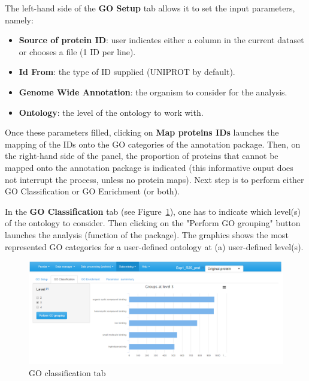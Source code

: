 \documentclass[12pt]{article}
\begin{document}
The left-hand side of the \textbf{GO Setup} tab allows it to set the input parameters, namely: 
\begin{itemize}
\item \textbf{Source of protein ID}: user indicates either a column in the current 
dataset or chooses a file (1 ID per line). 
\item \textbf{Id From}: the type of ID supplied (UNIPROT by default).
\item \textbf{Genome Wide Annotation}: the organism to consider for the analysis.  
\item \textbf{Ontology}: the level of the ontology to work with. 
\end{itemize}

Once these parameters filled, clicking on \textbf{Map proteins IDs} launches the mapping
of the IDs onto the GO categories of the annotation package. 
Then, on the right-hand side of the panel, 
the proportion of proteins that cannot be mapped onto the annotation package
is indicated (this informative ouput does not interrupt the process, unless no 
protein maps). Next step is to perform either GO Classification or GO Enrichment (or both). 

In the \textbf{GO Classification} tab (see Figure~\ref{fig:GO_tab2}), one has to 
indicate which level(s) of the ontology to consider.
Then clicking on the "Perform GO grouping" button launches the analysis 
(function  of the  package). 
The graphics shows the most represented GO categories for a user-defined 
ontology at (a) user-defined level(s).

\begin {figure}
\includegraphics[width=\textwidth]{images/GO_tab2.png}
\caption{GO classification tab}\label{fig:GO_tab2}
\end {figure}
\end{document}
